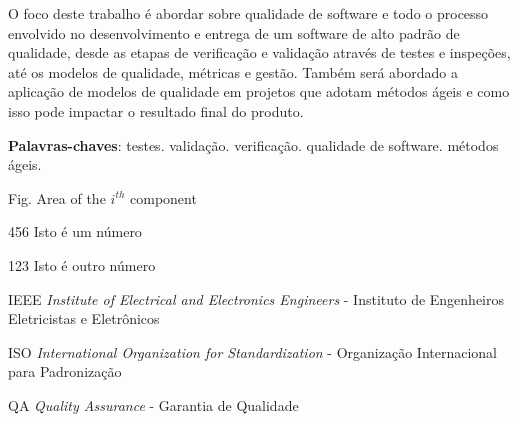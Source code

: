 \documentclass[
	12pt,				%
	openright,			%
	twoside,			%
	a4paper,			%
	english,			%
	brazil,				%
	]{abntex2}
\begin{document}
\frenchspacing 


\imprimircapa

\imprimirfolhaderosto


\begin{resumo}
 O foco deste trabalho é abordar sobre qualidade de software
 e todo o processo envolvido no desenvolvimento e entrega de
 um software de alto padrão de qualidade, desde as etapas de
 verificação e validação através de testes e inspeções, até 
 os modelos de qualidade, métricas e gestão. Também será
 abordado a aplicação de modelos de qualidade em projetos 
 que adotam métodos ágeis e como isso pode impactar o resultado
 final do produto.

 \vspace{\onelineskip}
    
 \noindent
 \textbf{Palavras-chaves}: testes. validação. verificação.
 qualidade de software. métodos ágeis.
\end{resumo}

\listoffigures*
\cleardoublepage

\listoftables*
\cleardoublepage

\begin{siglas}
  \item[Fig.] Area of the $i^{th}$ component
  \item[456] Isto é um número
  \item[123] Isto é outro número
  \item[IEEE] \emph{Institute of Electrical and Electronics Engineers} - Instituto de Engenheiros Eletricistas e Eletrônicos
  \item[ISO] \emph{International Organization for Standardization} - Organização Internacional para Padronização
  \item[QA] \emph{Quality Assurance} - Garantia de Qualidade
\end{siglas}
\end{document}
